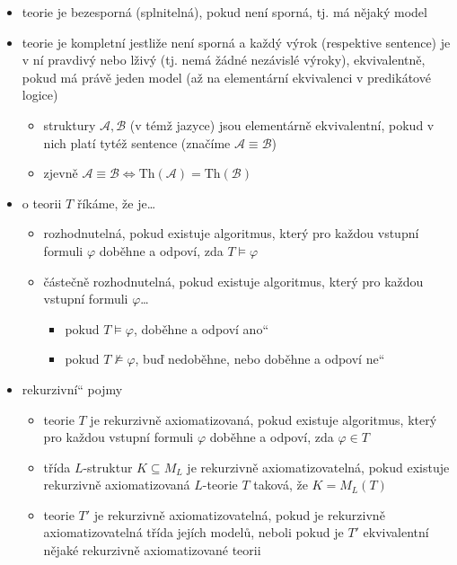 \begin{itemize}
\begin{itemize}
\begin{itemize}
\item v ní platí všechny výroky
\end{itemize}
\item teorie je bezesporná (splnitelná), pokud není sporná, tj. má nějaký model
\item teorie je kompletní jestliže není sporná a každý výrok (respektive sentence) je v ní pravdivý nebo lživý (tj. nemá žádné nezávislé výroky), ekvivalentně, pokud má právě jeden model (až na elementární ekvivalenci v predikátové logice)
\begin{itemize}
\item struktury $\mathcal{A,B}$ (v témž jazyce) jsou elementárně ekvivalentní, pokud v nich platí tytéž sentence (značíme $\mathcal A\equiv \mathcal B$)
\item zjevně $\mathcal A\equiv \mathcal B\iff\text{Th}(\mathcal A)=\text{Th}(\mathcal B)$
\end{itemize}
\item o teorii $T$ říkáme, že je\dots{}
\begin{itemize}
\item rozhodnutelná, pokud existuje algoritmus, který pro každou vstupní formuli $\varphi$ doběhne a odpoví, zda $T\models\varphi$
\item částečně rozhodnutelná, pokud existuje algoritmus, který pro každou vstupní formuli $\varphi$\dots{}
\begin{itemize}
\item pokud $T\vDash\varphi$, doběhne a odpoví \quotedblbase{}ano\textquotedblleft{}
\item pokud $T\nvDash\varphi$, buď nedoběhne, nebo doběhne a odpoví \quotedblbase{}ne\textquotedblleft{}
\end{itemize}
\end{itemize}
\item \quotedblbase{}rekurzivní\textquotedblleft{} pojmy
\begin{itemize}
\item teorie $T$ je rekurzivně axiomatizovaná, pokud existuje algoritmus, který pro každou vstupní formuli $\varphi$ doběhne a odpoví, zda $\varphi\in T$
\item třída $L$-struktur $K\subseteq M_L$ je rekurzivně axiomatizovatelná, pokud existuje rekurzivně axiomatizovaná $L$-teorie $T$ taková, že $K=M_L(T)$
\item teorie $T'$ je rekurzivně axiomatizovatelná, pokud je rekurzivně axiomatizovatelná třída jejích modelů, neboli pokud je $T'$ ekvivalentní nějaké rekurzivně axiomatizované teorii

\end{itemize}
\end{itemize}
\end{itemize}

